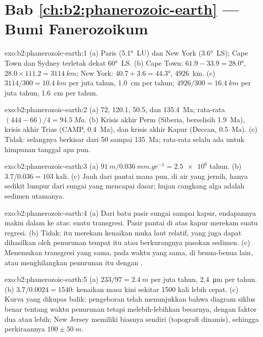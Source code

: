 \section*{Bab \ref{ch:b2:phanerozoic-earth} --- Bumi Fanerozoikum}

\begin{solution}{exo:b2:phanerozoic-earth:1}
(a) Paris (\ang{5.1}~LU) dan New York (\ang{3.6}~LS); Cape Town dan Sydney terletak dekat \ang{60}~LS.
(b) Cape Town: $61.9 - 33.9 = \ang{28.0}$, $28.0 \times 111.2 = \qty{3114}{km}$; New York:
$40.7 + 3.6 = \ang{44.3}$, \qty{4926}{km}. (c) $3114/300 = \qty{10.4}{km}$ per juta tahun,
\qty{1.0}{cm} per tahun; $4926/300 = \qty{16.4}{km}$ per juta tahun, \qty{1.6}{cm} per tahun.
\end{solution}

\begin{solution}{exo:b2:phanerozoic-earth:2}
(a) 72, 120.1, 50.5, dan \qty{135.4}{Ma}; rata-rata $(444 - 66)/4 = \qty{94.5}{Ma}$. (b) Krisis
akhir Perm (Siberia, berselisih \qty{1.9}{Ma}), krisis akhir Trias (CAMP, \qty{0.4}{Ma}), dan krisis
akhir Kapur (Deccan, \qty{0.5}{Ma}). (c) Tidak: selangnya berkisar dari 50 sampai
\qty{135}{Ma}; rata-rata selalu ada untuk himpunan tanggal apa pun.
\end{solution}

\begin{solution}{exo:b2:phanerozoic-earth:3}
(a) $\qty{91}{m}/\qty{0.036}{mm.yr^{-1}} = \num{2.5e6}$ tahun. (b) $3.7/0.036 = 103$ kali. (c)
Jauh dari pantai mana pun, di air yang jernih, hanya sedikit lumpur dari sungai yang mencapai dasar; hujan
cangkang alga adalah sedimen utamanya.
\end{solution}

\begin{solution}{exo:b2:phanerozoic-earth:4}
(a) Dari batu pasir sungai sampai kapur, endapannya makin dalam ke atas: suatu transgresi.
Pasir pantai di atas kapur merekam suatu regresi. (b) Tidak: itu merekam kenaikan muka laut relatif,
yang juga dapat dihasilkan oleh penurunan tempat itu atau berkurangnya pasokan sedimen. (c)
Menemukan transgresi yang sama, pada waktu yang sama, di benua-benua lain, atau menghilangkan
penurunan itu dengan .
\end{solution}

\begin{solution}{exo:b2:phanerozoic-earth:5}
(a) $233/97 = \qty{2.4}{m}$ per juta tahun, \qty{2.4}{\micro m} per tahun. (b) $3.7/0.0024 =
1540$: kenaikan masa kini sekitar 1500 kali lebih cepat. (c) Kurva yang dikupas balik: pengeboran telah menunjukkan
bahwa diagram siklus benar tentang waktu penurunan tetapi melebih-lebihkan besarnya, dengan faktor dua atau
lebih; New Jersey memiliki biasnya sendiri (topografi dinamis), sehingga perkiraannya $100 \pm
\qty{50}{m}$.
\end{solution}

